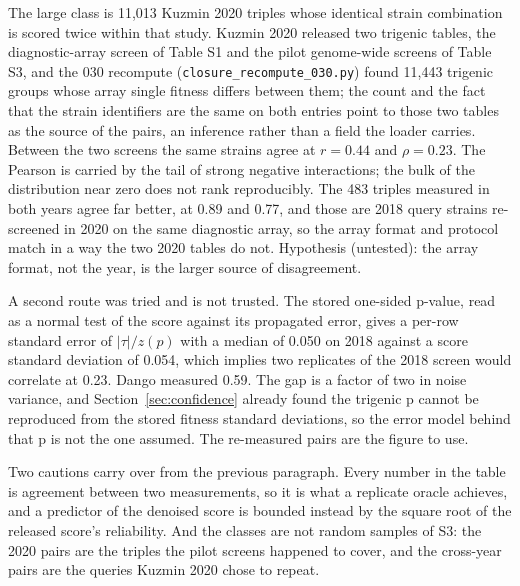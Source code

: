\begin{table}[htbp]
\centering
\footnotesize
\caption{Agreement between two interaction measurements of the same gene triple on
the 030 build, by what differs between the two entries. $r$ is Pearson, $\rho$ is
Spearman with a 95 percent bootstrap interval over triples, and the last column is
the median absolute difference between the two scores. Generated by
\texttt{triple\_noise\_ceiling\_030.py}.}
\label{tab:triple-reproducibility}

\end{table}

The large class is 11{,}013 Kuzmin 2020 triples whose identical strain combination is
scored twice within that study. Kuzmin 2020 released two trigenic tables, the
diagnostic-array screen of Table S1 and the pilot genome-wide screens of Table S3, and
the 030 recompute (\texttt{closure\_recompute\_030.py}) found 11{,}443 trigenic groups
whose array single fitness differs between them; the count and the fact that the strain
identifiers are the same on both entries point to those two tables as the source of the
pairs, an inference rather than a field the loader carries. Between the two screens the
same strains agree at $r = 0.44$ and $\rho = 0.23$. The Pearson is carried by the tail
of strong negative interactions; the bulk of the distribution near zero does not rank
reproducibly. The 483 triples measured in both years agree far better, at 0.89 and 0.77,
and those are 2018 query strains re-screened in 2020 on the same diagnostic array, so
the array format and protocol match in a way the two 2020 tables do not. Hypothesis
(untested): the array format, not the year, is the larger source of disagreement.

A second route was tried and is not trusted. The stored one-sided p-value, read as a
normal test of the score against its propagated error, gives a per-row standard error
of $|\tau| / z(p)$ with a median of 0.050 on 2018 against a score standard deviation of
0.054, which implies two replicates of the 2018 screen would correlate at 0.23. Dango
measured 0.59. The gap is a factor of two in noise variance, and Section~\ref{sec:confidence}
already found the trigenic p cannot be reproduced from the stored fitness standard
deviations, so the error model behind that p is not the one assumed. The re-measured
pairs are the figure to use.

Two cautions carry over from the previous paragraph. Every number in the table is
agreement between two measurements, so it is what a replicate oracle achieves, and a
predictor of the denoised score is bounded instead by the square root of the released
score's reliability. And the classes are not random samples of S3: the 2020 pairs are
the triples the pilot screens happened to cover, and the cross-year pairs are the
queries Kuzmin 2020 chose to repeat.

